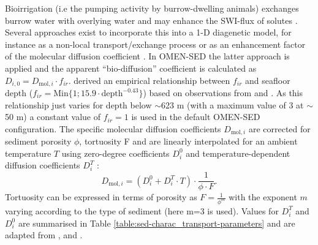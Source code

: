 \documentclass[gmd, manuscript]{copernicus}
\begin{document}
Bioirrigation (i.e the pumping activity by burrow-dwelling animals) exchanges burrow water with overlying water and may enhance the SWI-flux of solutes \citep{aller_importance_1984, aller1988benthic}. 
Several approaches exist to incorporate this into a 1-D diagenetic model, for instance as a non-local transport/exchange process \citep{boudreau_equivalence_1984, emerson_sediment-water_1984} 
or as an enhancement factor of the molecular diffusion coefficient \citep{devol_benthic_1993, soetaert_model_1996}. In OMEN-SED the latter approach is applied and the 
apparent ``bio-diffusion'' coefficient is calculated as $D_{i,0}=D_{\mathrm{mol},i}\cdot f_{ir}$. 
\citet{soetaert_model_1996} derived an empirical relationship between $f_{ir}$ and seafloor depth ($f_{ir} = \mathrm{Min}\{1; 15.9\cdot \mathrm{depth}^{-0.43}\}$) 
based on observations from \citet{archer_benthic_1992} and \citet{devol_benthic_1993}. As this relationship just varies for depth below $\sim$623 m (with a maximum 
value of 3 at $\sim$50 m) a constant value of $f_{ir}=1$ is used in the default OMEN-SED configuration. 
The specific molecular diffusion coefficients $D_{\mathrm{mol},i}$ are corrected for sediment porosity $\phi$, tortuosity F and are linearly interpolated for an ambient 
temperature $T$ using zero-degree coefficients $D^0_i$ and temperature-dependent diffusion coefficients $D^T_i$ \citep[][]{soetaert_model_1996}:
\begin{equation*}
 D_{\mathrm{mol},i} = (D^0_i + D^T_i \cdot T )\cdot \frac{1}{\phi\cdot F}.
\end{equation*}
Tortuosity can be expressed in terms of porosity as $F = \frac{1}{\phi^m}$ \citep{ullman_diffusion_1982} with the exponent $m$ varying according to the type of sediment (here m=3 is used). 
Values for $D^T_i$ and $D^0_i$ are summarised in Table \ref{table:sed-charac_transport-parameters} and are adapted from \citet{Li_diffusion_1974}, \citet{schulz_quantification_2006} and \citet{gypens_simple_2008}.
\end{document}

